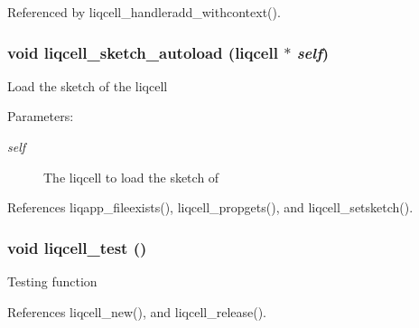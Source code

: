 Referenced by liqcell\_\-handleradd\_\-withcontext().
\subsubsection[{liqcell\_\-sketch\_\-autoload}]{\setlength{\rightskip}{0pt plus 5cm}void liqcell\_\-sketch\_\-autoload (liqcell $\ast$ {\em self})}\label{d5/da2/liqcell_8c_0cc39c8747c881d9bcb6513bd1f18fea}


Load the sketch of the liqcell \begin{Desc}
\item[Parameters:]
\begin{description}
\item[{\em self}]The liqcell to load the sketch of \end{description}
\end{Desc}


References liqapp\_\-fileexists(), liqcell\_\-propgets(), and liqcell\_\-setsketch().
\subsubsection[{liqcell\_\-test}]{\setlength{\rightskip}{0pt plus 5cm}void liqcell\_\-test ()}\label{d5/da2/liqcell_8c_fbfdb285ecda8ef01ff24e5b3a1174f9}


Testing function 

References liqcell\_\-new(), and liqcell\_\-release().